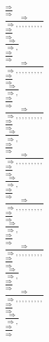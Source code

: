 \documentclass[11pt]{article}
\begin{document}
\begin{center}
\bigskip
\\$\frac{\Rightarrow }{\Rightarrow }$
\bigskip
\\$\frac{\Rightarrow }{\Rightarrow , , , , , , , , , }$
\bigskip
\\$\frac{\Rightarrow }{\Rightarrow }$
\bigskip
\\$\frac{\Rightarrow }{\Rightarrow , }$
\bigskip
\\$\frac{\Rightarrow }{\Rightarrow }$
\bigskip
\\$\frac{\Rightarrow }{\Rightarrow , , , , , , , , , }$
\bigskip
\\$\frac{\Rightarrow }{\Rightarrow }$
\bigskip
\\$\frac{\Rightarrow }{\Rightarrow , }$
\bigskip
\\$\frac{\Rightarrow }{\Rightarrow }$
\bigskip
\\$\frac{\Rightarrow }{\Rightarrow , , , , , , , , , }$
\bigskip
\\$\frac{\Rightarrow }{\Rightarrow }$
\bigskip
\\$\frac{\Rightarrow }{\Rightarrow , }$
\bigskip
\\$\frac{\Rightarrow }{\Rightarrow }$
\bigskip
\\$\frac{\Rightarrow }{\Rightarrow , , , , , , , , , }$
\bigskip
\\$\frac{\Rightarrow }{\Rightarrow }$
\bigskip
\\$\frac{\Rightarrow }{\Rightarrow , }$
\bigskip
\\$\frac{\Rightarrow }{\Rightarrow }$
\bigskip
\\$\frac{\Rightarrow }{\Rightarrow , , , , , , , , , }$
\bigskip
\\$\frac{\Rightarrow }{\Rightarrow }$
\bigskip
\\$\frac{\Rightarrow }{\Rightarrow , }$
\bigskip
\\$\frac{\Rightarrow }{\Rightarrow }$
\bigskip
\\$\frac{\Rightarrow }{\Rightarrow , , , , , , , , , }$
\bigskip
\\$\frac{\Rightarrow }{\Rightarrow }$
\bigskip
\\$\frac{\Rightarrow }{\Rightarrow , }$
\bigskip
\\$\frac{\Rightarrow }{\Rightarrow }$
\bigskip
\\$\frac{\Rightarrow }{\Rightarrow , , , , , , , , , }$
\bigskip
\\$\frac{\Rightarrow }{\Rightarrow }$
\bigskip
\\$\frac{\Rightarrow }{\Rightarrow , }$
\bigskip
\\$\frac{\Rightarrow }{\Rightarrow }$

\end{center}
\end{document}
